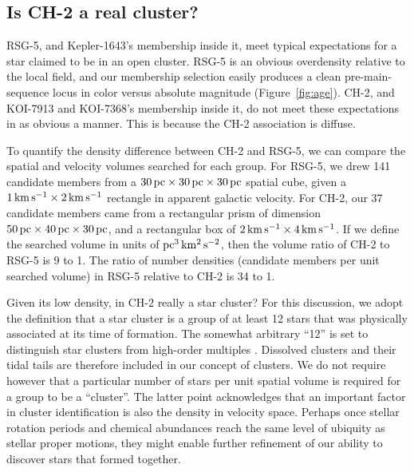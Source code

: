 \documentclass[12pt,twocolumn]{aastex63}
\newcommand{\mkms}{{\rm \,km\,s^{-1}}}  %
\begin{document}
\subsection{Is CH-2 a real cluster?}
\label{subsec:ch2}

RSG-5, and Kepler-1643's membership inside it, meet typical
expectations for a star claimed to be in an open cluster.  RSG-5 is an
obvious overdensity relative to the local field, and our
membership selection easily produces a clean pre-main-sequence locus
in color versus absolute magnitude (Figure~\ref{fig:age}).  CH-2, and
KOI-7913 and KOI-7368's membership inside it, do not meet these
expectations in as obvious a manner.  This is because the CH-2
association is diffuse.

To quantify the density difference between CH-2 and RSG-5, we can compare the spatial and
velocity volumes searched for each group.
For RSG-5, we drew 141 candidate members from a $30\,{\rm
pc}\times30\,{\rm pc}\times30\,{\rm pc}$ spatial cube, given a $1 {\rm
\mkms} \times 2 {\rm \mkms }$ rectangle in apparent galactic velocity.
For CH-2, our 37 candidate members came from a rectangular prism of
dimension $50\,{\rm pc}\times40\,{\rm pc}\times30\,{\rm pc}$, and a
rectangular box of $2 {\rm \mkms} \times 4 {\rm \mkms}$.  If we define
the searched volume in units of ${\rm pc}^3\,{\rm km^2}\,{\rm s^{-2}}$, then
the volume ratio of CH-2 to RSG-5 is 9 to 1.  The ratio of number
densities (candidate members per unit searched volume) in RSG-5
relative to CH-2 is 34 to 1.

Given its low density, in CH-2 really a star cluster?  For this
discussion, we adopt the definition that a star cluster is a group
of at least 12 stars that was physically associated at its time of
formation.  The somewhat arbitrary ``12'' is set to distinguish star
clusters from high-order multiples \citep[see][]{krumholz_star_2019}.
Dissolved clusters and their tidal tails are therefore included in our
concept of clusters.  We do not require however that a particular number of stars per
unit spatial volume is required for a group to be a ``cluster''.
The latter point acknowledges that an important
factor in cluster identification is also the density in velocity
space.  Perhaps once stellar rotation periods and chemical abundances
reach the same level of ubiquity as stellar proper motions, they might
enable further refinement of our ability to discover stars that formed
together.
\end{document}
